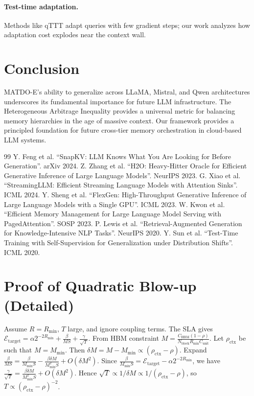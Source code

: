 \documentclass[11pt,a4paper]{article}
\theoremstyle{plain}
\theoremstyle{definition}
\begin{document}
\paragraph{Test-time adaptation.} Methods like qTTT \cite{qttt} adapt queries with few gradient steps; our work analyzes how adaptation cost explodes near the context wall.

\section{Conclusion}
MATDO-E's ability to generalize across LLaMA, Mistral, and Qwen architectures underscores its fundamental importance for future LLM infrastructure. The Heterogeneous Arbitrage Inequality provides a universal metric for balancing memory hierarchies in the age of massive context. Our framework provides a principled foundation for future cross-tier memory orchestration in cloud-based LLM systems.


\begin{thebibliography}{99}
 Y. Feng et al. ``SnapKV: LLM Knows What You Are Looking for Before Generation''. arXiv 2024.
 Z. Zhang et al. ``H2O: Heavy-Hitter Oracle for Efficient Generative Inference of Large Language Models''. NeurIPS 2023.
 G. Xiao et al. ``StreamingLLM: Efficient Streaming Language Models with Attention Sinks''. ICML 2024.
 Y. Sheng et al. ``FlexGen: High-Throughput Generative Inference of Large Language Models with a Single GPU''. ICML 2023.
 W. Kwon et al. ``Efficient Memory Management for Large Language Model Serving with PagedAttention''. SOSP 2023.
 P. Lewis et al. ``Retrieval-Augmented Generation for Knowledge-Intensive NLP Tasks''. NeurIPS 2020.
 Y. Sun et al. ``Test-Time Training with Self-Supervision for Generalization under Distribution Shifts''. ICML 2020.
\end{thebibliography}

\appendix
\section{Proof of Quadratic Blow-up (Detailed)}
Assume $R=R_{\min}$, $T$ large, and ignore coupling terms. The SLA gives $\mathcal{E}_{\text{target}} = \alpha 2^{-2R_{\min}} + \frac{\beta}{MS} + \frac{\gamma}{\sqrt{T}}$. From HBM constraint $M = \frac{C_{\text{HBM}}(1-\rho)}{N_{\text{block}} R_{\min} C_{\text{unit}}}$. Let $\rho_{\text{ctx}}$ be such that $M=M_{\min}$. Then $\delta M = M-M_{\min} \propto (\rho_{\text{ctx}}-\rho)$. Expand $\frac{\beta}{MS} = \frac{\beta}{M_{\min}S} - \frac{\beta \delta M}{M_{\min}^2 S} + O(\delta M^2)$. Since $\frac{\beta}{M_{\min}S} = \mathcal{E}_{\text{target}} - \alpha 2^{-2R_{\min}}$, we have $\frac{\gamma}{\sqrt{T}} = \frac{\beta \delta M}{M_{\min}^2 S} + O(\delta M^2)$. Hence $\sqrt{T} \propto 1/\delta M \propto 1/(\rho_{\text{ctx}}-\rho)$, so $T \propto (\rho_{\text{ctx}}-\rho)^{-2}$.
\end{document}
